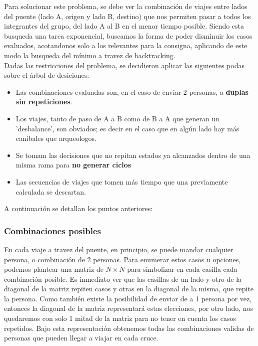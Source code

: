 Para solucionar este problema, se debe ver la combinaci\'on de viajes entre lados del puente (lado A, origen y lado B, destino) que nos permiten pasar a todos los integrantes
del grupo, del lado A al B en el menor tiempo posible. Siendo esta busqueda una tarea exponencial, buscamos la forma de poder disminuir los casos evaluados, acotandonos solo a los relevantes
para la consigna, aplicando de este modo la busqueda del m\'inimo a travez de backtracking.\\

Dadas las restricciones del problema, se decidieron aplicar las siguientes podas sobre el árbol de desiciones:
\begin{itemize}
	\item Las combinaciones evaluadas son, en el caso de enviar 2 personas, a {\bf duplas sin repeticiones}.
	\item Los viajes, tanto de paso de A a B como de B a A que generan un 'desbalance', son obviados; es decir en el caso que en alg\'un lado hay más canibales que arqueologos.
	
	\item Se tomam las decisiones que no repitan estados ya alcanzados dentro de una misma rama para {\bf no generar  ciclos}
	\item Las secuencias de viajes que tomen más tiempo que una previamente calculada se descartan.
\end{itemize}

A continuación se detallan los puntos anteriores:


\subsubsection*{Combinaciones posibles}
En cada viaje a travez del puente, en principio, se puede mandar cualquier persona, o combinación de 2 personas. Para enumerar estos casos u opciones, podemos plantear una matriz de $N \times N$ para simbolizar en cada casilla cada combinación posible. Es inmediato ver que las casillas de un lado y otro de la diagonal de la matriz repiten casos y otras en la diagonal de la misma, que repite la persona. Como también existe la posibilidad de enviar de a 1 persona por vez, entonces la diagonal de la matriz representará estas elecciones, por otro lado, nos quedaremos con solo 1 mitad de la matriz para no tener en cuenta los casos repetidos. Bajo esta representación obtenemos todas las combinaciones validas de personas que pueden llegar a viajar en cada cruce.

